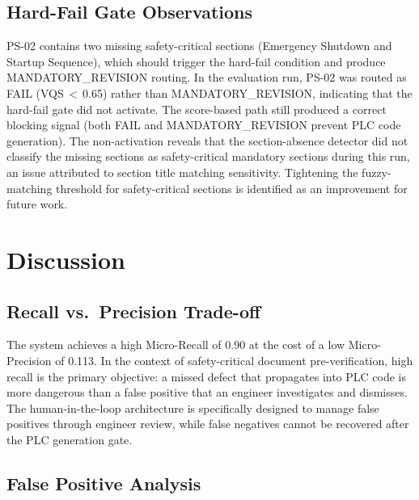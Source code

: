 \documentclass[journal]{IEEEtran}
\begin{document}
\subsection{Hard-Fail Gate Observations}

PS-02 contains two missing safety-critical sections (Emergency Shutdown and
Startup Sequence), which should trigger the hard-fail condition and produce
MANDATORY\_REVISION routing. In the evaluation run, PS-02 was routed as FAIL
(VQS\,$<$\,0.65) rather than MANDATORY\_REVISION, indicating that the hard-fail
gate did not activate. The score-based path still produced a correct blocking
signal (both FAIL and MANDATORY\_REVISION prevent PLC code generation). The
non-activation reveals that the section-absence detector did not classify the
missing sections as safety-critical mandatory sections during this run, an issue
attributed to section title matching sensitivity. Tightening the fuzzy-matching
threshold for safety-critical sections is identified as an improvement for
future work.

\section{Discussion}
\label{sec:discuss}

\subsection{Recall vs.\ Precision Trade-off}

The system achieves a high Micro-Recall of 0.90 at the cost of a low
Micro-Precision of 0.113. In the context of safety-critical document
pre-verification, high recall is the primary objective: a missed defect that
propagates into PLC code is more dangerous than a false positive that an
engineer investigates and dismisses. The human-in-the-loop architecture is
specifically designed to manage false positives through engineer review, while
false negatives cannot be recovered after the PLC generation gate.

\subsection{False Positive Analysis}
\end{document}
